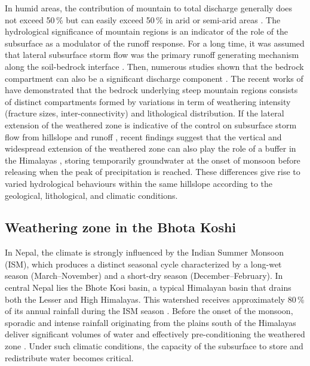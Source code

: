 \documentclass[hess, manuscript]{copernicus}
\begin{document}
In humid areas, the contribution of mountain to total discharge generally does not exceed 50\,\% but can easily exceed 50\,\% in arid or semi-arid areas \citep{messerli-etal-2004}. The hydrological significance of mountain regions is an indicator of the role of the subsurface as a modulator of the runoff response. For a long time, it was assumed that lateral subsurface storm flow was the primary runoff generating mechanism along the soil-bedrock interface \citep{weiler-etal-2006}. Then, numerous studies shown that the bedrock compartment can also be a significant discharge component \citep{katsuyama-etal-2009,tromp-van-meerveld-etal-2007}. The recent works of \cite{rempe-2018} have demonstrated that the bedrock underlying steep mountain regions consists of distinct compartments formed by variations in term of weathering intensity (fracture sizes, inter-connectivity) and lithological distribution. If the lateral extension of the weathered zone is indicative of the control on subsurface storm flow from hillslope and runoff \citep{jencso-etal-2009,tromp-van-meerveld-2006}, recent findings suggest that the vertical and widespread extension of the weathered zone can also play the role of a buffer in the Himalayas \citep{teagai-etal-2026}, storing temporarily groundwater at the onset of monsoon before releasing when the peak of precipitation is reached. These differences give rise to varied hydrological behaviours within the same hillslope according to the geological, lithological, and climatic conditions.


\subsection{Weathering zone in the Bhota Koshi}

In Nepal, the climate is strongly influenced by the Indian Summer Monsoon (ISM), which produces a distinct seasonal cycle characterized by a long-wet season (March–November) and a short-dry season (December–February). In central Nepal lies the Bhote Kosi basin, a typical Himalayan basin that drains both the Lesser and High Himalayas. This watershed receives approximately 80\,\% of its annual rainfall during the ISM season . Before the onset of the monsoon, sporadic and intense rainfall originating from the plains south of the Himalayas deliver significant volumes of water and effectively pre-conditioning the weathered zone . Under such climatic conditions, the capacity of the subsurface to store and redistribute water becomes critical.
\end{document}
